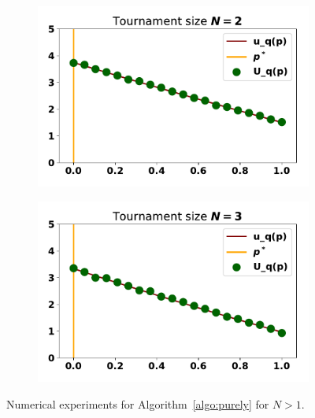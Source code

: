 \documentclass[10pt]{article}
\begin{document}
\begin{figure}
    \centering
    \begin{subfigure}{0.45\textwidth}
        \centering
        \includegraphics[width=.95\textwidth]{img/purely_random_tournament_one.pdf}
    \end{subfigure}
    \begin{subfigure}{0.45\textwidth}
        \centering
        \includegraphics[width=.95\textwidth]{img/purely_random_tournament_two.pdf}
    \end{subfigure}
    \caption{Numerical experiments for Algorithm~\ref{algo:purely} for \(N>1\).}
    \label{fig:purely_random_tournament_results}
\end{figure}

\end{document}
